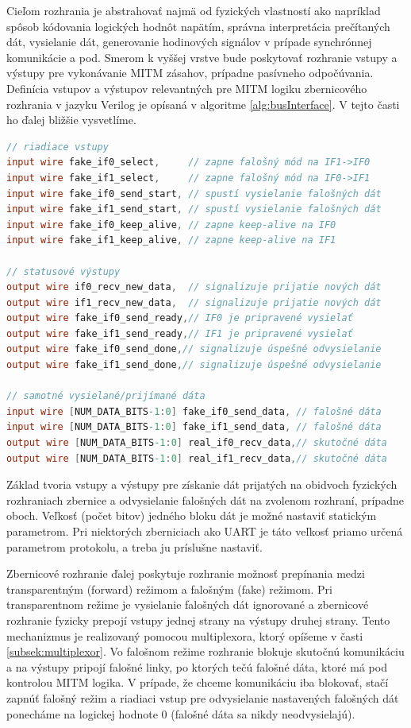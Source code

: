 Cieľom rozhrania je abstrahovať najmä od fyzických vlastností ako napríklad spôsob kódovania logických hodnôt napätím, správna interpretácia prečítaných dát, vysielanie dát, generovanie hodinových signálov v prípade synchrónnej komunikácie a pod. Smerom k vyššej vrstve bude poskytovať rozhranie vstupy a výstupy pre vykonávanie MITM zásahov, prípadne pasívneho odpočúvania. Definícia vstupov a výstupov relevantných pre MITM logiku zbernicového rozhrania v jazyku Verilog je opísaná v algoritme \ref{alg:busInterface}. V tejto časti ho ďalej bližšie vysvetlíme.

\begin{lstlisting}[float,language=Verilog,caption={Definícia vstupov a výstupov zbernicového rozhrania pre MITM logiku. Parameter NUM\_DATA\_BITS nastaví veľkosť bloku prijímaných/vysielaných dát.},label=alg:busInterface]
// riadiace vstupy
input wire fake_if0_select,     // zapne falošný mód na IF1->IF0
input wire fake_if1_select,     // zapne falošný mód na IF0->IF1
input wire fake_if0_send_start, // spustí vysielanie falošných dát
input wire fake_if1_send_start, // spustí vysielanie falošných dát
input wire fake_if0_keep_alive, // zapne keep-alive na IF0
input wire fake_if1_keep_alive, // zapne keep-alive na IF1

// statusové výstupy
output wire if0_recv_new_data,  // signalizuje prijatie nových dát
output wire if1_recv_new_data,  // signalizuje prijatie nových dát
output wire fake_if0_send_ready,// IF0 je pripravené vysielať   
output wire fake_if1_send_ready,// IF1 je pripravené vysielať   
output wire fake_if0_send_done,// signalizuje úspešné odvysielanie
output wire fake_if1_send_done,// signalizuje úspešné odvysielanie

// samotné vysielané/prijímané dáta
input wire [NUM_DATA_BITS-1:0] fake_if0_send_data, // falošné dáta
input wire [NUM_DATA_BITS-1:0] fake_if1_send_data, // falošné dáta
output wire [NUM_DATA_BITS-1:0] real_if0_recv_data,// skutočné dáta
output wire [NUM_DATA_BITS-1:0] real_if1_recv_data,// skutočné dáta
\end{lstlisting}

Základ tvoria vstupy a výstupy pre získanie dát prijatých na obidvoch fyzických rozhraniach zbernice a odvysielanie falošných dát na zvolenom rozhraní, prípadne oboch. Veľkosť (počet bitov) jedného bloku dát je možné nastaviť statickým parametrom. Pri niektorých zberniciach ako UART je táto veľkosť priamo určená parametrom protokolu, a treba ju príslušne nastaviť.

Zbernicové rozhranie ďalej poskytuje rozhranie možnosť prepínania medzi transparentným (forward) režimom a falošným (fake) režimom. Pri transparentnom režime je vysielanie falošných dát ignorované a zbernicové rozhranie fyzicky prepojí vstupy jednej strany na výstupy druhej strany. Tento mechanizmus je realizovaný pomocou multiplexora, ktorý opíšeme v časti \ref{subsek:multiplexor}. Vo falošnom režime rozhranie blokuje skutočnú komunikáciu a na výstupy pripojí falošné linky, po ktorých tečú falošné dáta, ktoré má pod kontrolou MITM logika. V prípade, že chceme komunikáciu iba blokovať, stačí zapnúť falošný režim a riadiaci vstup pre odvysielanie nastavených falošných dát ponecháme na logickej hodnote 0 (falošné dáta sa nikdy neodvysielajú).

